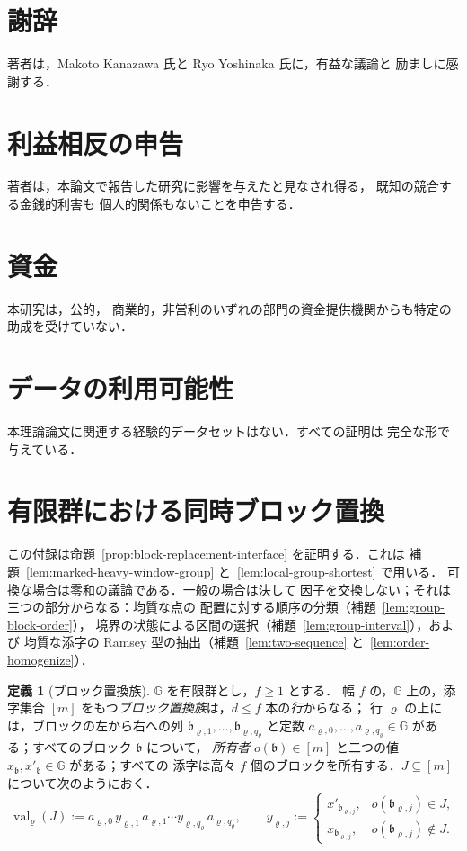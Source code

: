 \documentclass[11pt,a4paper]{ltjsarticle}
\numberwithin{equation}{section}
\theoremstyle{plain}
\theoremstyle{definition}
\newtheorem{definition}[theorem]{定義}
\theoremstyle{remark}
\theoremstyle{plain}
\begin{document}
\section*{謝辞}
著者は，Makoto Kanazawa 氏と Ryo Yoshinaka 氏に，有益な議論と
励ましに感謝する．

\section*{利益相反の申告}
著者は，本論文で報告した研究に影響を与えたと見なされ得る，
既知の競合する金銭的利害も
個人的関係もないことを申告する．

\section*{資金}
本研究は，公的，
商業的，非営利のいずれの部門の資金提供機関からも特定の助成を受けていない．

\section*{データの利用可能性}
本理論論文に関連する経験的データセットはない．すべての証明は
完全な形で与えている．

\appendix
\section{有限群における同時ブロック置換}
\label{app:group-blocks}

この付録は命題~\ref{prop:block-replacement-interface} を証明する．これは
補題~\ref{lem:marked-heavy-window-group} と~\ref{lem:local-group-shortest} で用いる．
可換な場合は零和の議論である．一般の場合は決して
因子を交換しない；それは三つの部分からなる：均質な点の
配置に対する順序の分類（補題~\ref{lem:group-block-order}），
境界の状態による区間の選択（補題~\ref{lem:group-interval}），および
均質な添字の Ramsey 型の抽出（補題~\ref{lem:two-sequence} と~\ref{lem:order-homogenize}）．

\begin{definition}[ブロック置換族]
\label{def:block-family}
${\mathbb G}$ を有限群とし，$f\ge1$ とする．
幅 $f$ の，${\mathbb G}$ 上の，添字集合 $[m]$ をもつ\emph{ブロック置換族}は，$d\le f$ 本の\emph{行}からなる；
行 $\varrho$ の上には，ブロックの左から右への列 $\mathfrak b_{\varrho,1},\ldots,\mathfrak b_{\varrho,q_\varrho}$
と定数 $a_{\varrho,0},\ldots,a_{\varrho,q_\varrho}\in {\mathbb G}$ がある；すべてのブロック $\mathfrak b$ について，
\emph{所有者} $o(\mathfrak b)\in[m]$ と二つの値 $x_{\mathfrak b},x'_{\mathfrak b}\in {\mathbb G}$ がある；すべての
添字は高々 $f$ 個のブロックを所有する．$J\subseteq[m]$ について次のようにおく．
\[
 \operatorname{val}_\varrho(J):=a_{\varrho,0}\,y_{\varrho,1}\,a_{\varrho,1}\cdots y_{\varrho,q_\varrho}\,a_{\varrho,q_\varrho},
 \qquad
 y_{\varrho,j}:=
 \begin{cases}
 x'_{\mathfrak b_{\varrho,j}},& o(\mathfrak b_{\varrho,j})\in J,\\
 x_{\mathfrak b_{\varrho,j}},& o(\mathfrak b_{\varrho,j})\notin J.
 \end{cases}
\]
\end{definition}
\end{document}

